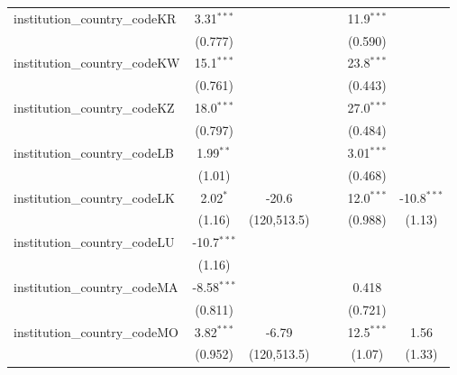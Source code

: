 \begin{tabular}{lcccccc}
   institution\_country\_codeKR          & 3.31$^{***}$   &               &               &            & 11.9$^{***}$  &   \\   
                                         & (0.777)        &               &               &            & (0.590)       &   \\   
   institution\_country\_codeKW          & 15.1$^{***}$   &               &               &            & 23.8$^{***}$  &   \\   
                                         & (0.761)        &               &               &            & (0.443)       &   \\   
   institution\_country\_codeKZ          & 18.0$^{***}$   &               &               &            & 27.0$^{***}$  &   \\   
                                         & (0.797)        &               &               &            & (0.484)       &   \\   
   institution\_country\_codeLB          & 1.99$^{**}$    &               &               &            & 3.01$^{***}$  &   \\   
                                         & (1.01)         &               &               &            & (0.468)       &   \\   
   institution\_country\_codeLK          & 2.02$^{*}$     & -20.6         &               &            & 12.0$^{***}$  & -10.8$^{***}$\\   
                                         & (1.16)         & (120,513.5)   &               &            & (0.988)       & (1.13)\\   
   institution\_country\_codeLU          & -10.7$^{***}$  &               &               &            &               &   \\   
                                         & (1.16)         &               &               &            &               &   \\   
   institution\_country\_codeMA          & -8.58$^{***}$  &               &               &            & 0.418         &   \\   
                                         & (0.811)        &               &               &            & (0.721)       &   \\   
   institution\_country\_codeMO          & 3.82$^{***}$   & -6.79         &               &            & 12.5$^{***}$  & 1.56\\   
                                         & (0.952)        & (120,513.5)   &               &            & (1.07)        & (1.33)\\   

\end{tabular}
